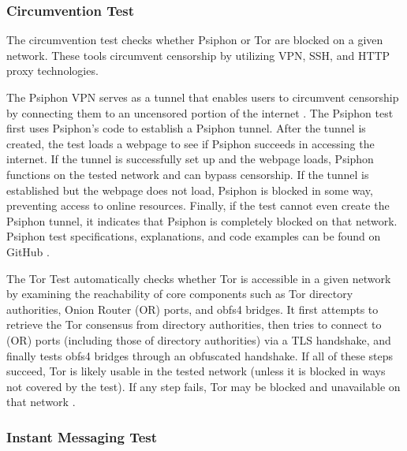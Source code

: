 \subsubsection{Circumvention Test}

The circumvention test checks whether Psiphon or Tor are blocked on a given network. These tools circumvent censorship by utilizing VPN, SSH, and HTTP proxy technologies. 

The Psiphon VPN serves as a tunnel that enables users to circumvent censorship by connecting them to an uncensored portion of the internet \cite{ooniPsiphonTest}. The Psiphon test first uses Psiphon’s code to establish a Psiphon tunnel. After the tunnel is created, the test loads a webpage to see if Psiphon succeeds in accessing the internet. If the tunnel is successfully set up and the webpage loads, Psiphon functions on the tested network and can bypass censorship. If the tunnel is established but the webpage does not load, Psiphon is blocked in some way, preventing access to online resources. Finally, if the test cannot even create the Psiphon tunnel, it indicates that Psiphon is completely blocked on that network. Psiphon test specifications, explanations, and code examples can be found on GitHub \cite{PsiphonTestGitHub}.

The Tor Test \cite{TorTestABOUTOONI} automatically checks whether Tor is accessible in a given network by examining the reachability of core components such as Tor directory authorities, Onion Router (OR) ports, and obfs4 bridges. It first attempts to retrieve the Tor consensus from directory authorities, then tries to connect to (OR) ports (including those of directory authorities) via a TLS handshake, and finally tests obfs4 bridges through an obfuscated handshake. If all of these steps succeed, Tor is likely usable in the tested network (unless it is blocked in ways not covered by the test). If any step fails, Tor may be blocked and unavailable on that network \cite{TorTestGitHub}.


\subsubsection{Instant Messaging Test}

